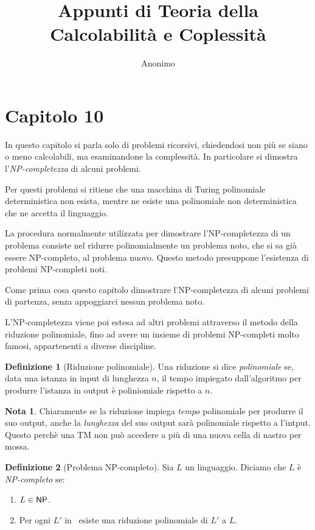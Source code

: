 \documentclass[12pt]{article}
\theoremstyle{definition}
\newtheorem*{mydef}{Definizione}
\newtheorem*{mynote}{Nota}
\begin{document}
\title{Appunti di Teoria della Calcolabilit\`{a} e Coplessit\`{a}}
\author{Anonimo}
\maketitle

\justify

\section{Capitolo 10}

In questo capitolo si parla solo di problemi ricorsivi, chiedendosi non pi\`u
se siano o meno calcolabili, ma esaminandone la complessit\`a. In particolare si
dimostra l'{\em NP-completezza} di alcuni problemi.

Per questi problemi si ritiene che una macchina di Turing polinomiale deterministica non esista,
mentre ne esiste una polinomiale non deterministica che ne accetta il linguaggio.

La procedura normalmente utilizzata per dimostrare l'NP-completezza di un problema
consiste nel ridurre polinomialmente un problema noto, che si sa gi\`a essere NP-completo,
al problema nuovo. Questo metodo presuppone l'esistenza di problemi NP-completi noti.

Come prima cosa questo capitolo dimostrare l'NP-completezza di alcuni problemi di partenza,
senza appoggiarci nessun problema noto.

L'NP-completezza viene poi estesa ad altri problemi attraverso il metodo della riduzione polinomiale,
fino ad avere un insieme di problemi NP-completi molto famosi, appartenenti a diverse discipline.

\begin{mydef}[Riduzione polinomiale]
Una riduzione si dice {\em polinomiale} se, data una istanza in input di lunghezza \(n\),
il tempo impiegato dall'algoritmo per produrre l'istanza in output \`e poliniomiale rispetto a \(n\).
\end{mydef}

\begin{mynote}
Chiaramente se la riduzione impiega {\em tempo} polinomiale per produrre il suo output,
anche la {\em lunghezza} del suo output sar\`a polinomiale rispetto a l'intput. Questo perch\`e
una TM non pu\`o accedere a pi\`u di una nuova cella di nastro per mossa.
\end{mynote}

\begin{mydef}[Problema NP-completo]
Sia \(L\) un linguaggio. Diciamo che \(L\) \`e {\em NP-completo} se:

\begin{enumerate}
  \item \(L \in {\ensuremath{\mathsf{NP}}}\).
  \item Per ogni \(L'\) in \NP\ esiste una riduzione polinomiale di \(L'\) a \(L\).
\end{enumerate}

\end{mydef}
\end{document}
